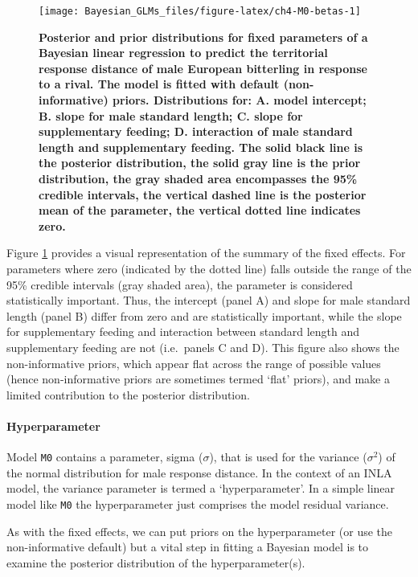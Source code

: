\documentclass[
]{book}
\begin{document}
\begin{figure}

{\centering \texttt{[image: Bayesian\_GLMs\_files/figure-latex/ch4-M0-betas-1]} 

}

\caption{\textbf{Posterior and prior distributions for fixed parameters of a Bayesian linear regression to predict the territorial response distance of male European bitterling in response to a rival. The model is fitted with default (non-informative) priors. Distributions for: A. model intercept; B. slope for male standard length; C. slope for supplementary feeding; D. interaction of male standard length and supplementary feeding. The solid black line is the posterior distribution, the solid gray line is the prior distribution, the gray shaded area encompasses the 95\% credible intervals, the vertical dashed line is the posterior mean of the parameter, the vertical dotted line indicates zero.}}\label{fig:ch4-M0-betas}
\end{figure}

Figure \ref{fig:ch4-M0-betas} provides a visual representation of the summary of the fixed effects. For parameters where zero (indicated by the dotted line) falls outside the range of the 95\% credible intervals (gray shaded area), the parameter is considered statistically important. Thus, the intercept (panel A) and slope for male standard length (panel B) differ from zero and are statistically important, while the slope for supplementary feeding and interaction between standard length and supplementary feeding are not (i.e.~panels C and D). This figure also shows the non-informative priors, which appear flat across the range of possible values (hence non-informative priors are sometimes termed `flat' priors), and make a limited contribution to the posterior distribution.

\hypertarget{hyperparameter}{%
\paragraph{Hyperparameter}\label{hyperparameter}}

Model \texttt{M0} contains a parameter, sigma (\(\sigma\)), that is used for the variance (\(\sigma{^2}\)) of the normal distribution for male response distance. In the context of an INLA model, the variance parameter is termed a `hyperparameter'. In a simple linear model like \texttt{M0} the hyperparameter just comprises the model residual variance.

As with the fixed effects, we can put priors on the hyperparameter (or use the non-informative default) but a vital step in fitting a Bayesian model is to examine the posterior distribution of the hyperparameter(s).
\end{document}
